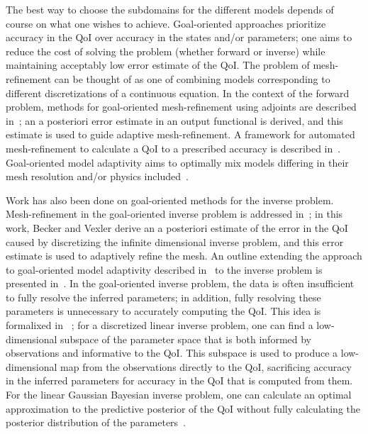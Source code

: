 The best way to choose the subdomains for the different models depends of course on what one wishes to achieve. Goal-oriented approaches prioritize accuracy in the QoI over accuracy in the states and/or parameters; one aims to reduce the cost of solving the problem (whether forward or inverse) while maintaining acceptably low error estimate of the QoI. The problem of mesh-refinement can be thought of as one of combining models corresponding to different discretizations of a continuous equation. In the context of the forward problem, methods for goal-oriented mesh-refinement using adjoints are described in~\cite{PrudOden99,VendDarm00,BecRann01}; an a posteriori error estimate in an output functional is derived, and this estimate is used to guide adaptive mesh-refinement. A framework for automated mesh-refinement to calculate a QoI to a prescribed accuracy is described in~\cite{Yano12}. Goal-oriented model adaptivity aims to optimally mix models differing in their mesh resolution and/or physics included~\cite{OdenPrudetal06,BraackErn03}.

Work has also been done on goal-oriented methods for the inverse problem. Mesh-refinement in the goal-oriented inverse problem is addressed in~\cite{BecVex05}; in this work, Becker and Vexler derive an a posteriori estimate of the error in the QoI caused by discretizing the infinite dimensional inverse problem, and this error estimate is used to adaptively refine the mesh. An outline extending the approach to goal-oriented model adaptivity described in~\cite{OdenPrudetal06} to the inverse problem is presented in~\cite{OdenPrudetal10}. In the goal-oriented inverse problem, the data is often insufficient to fully resolve the inferred parameters; in addition, fully resolving these parameters is unnecessary to accurately computing the QoI. This idea is formalixed in ~\cite{LiebWill13}; for a discretized linear inverse problem, one can find a low-dimensional subspace of the parameter space that is both informed by observations and informative to the QoI. This subspace is used to produce a low-dimensional map from the observations directly to the QoI, sacrificing accuracy in the inferred parameters for accuracy in the QoI that is computed from them. For the linear Gaussian Bayesian inverse problem, one can calculate an optimal approximation to the predictive posterior of the QoI without fully calculating the posterior distribution of the parameters~\cite{Span16}. 

